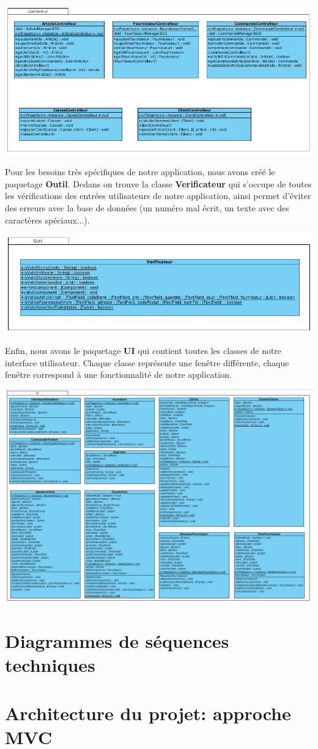 \begin{center}
\includegraphics[width=14cm]{./Conception/controlleur}
\end{center}

Pour les besoins très spécifiques de notre application, nous avons créé le paquetage \textbf{Outil}. Dedans on trouve la classe \textbf{Verificateur} qui s'occupe de toutes les vérifications des entrées utilisateurs de notre application, ainsi permet d'éviter des erreurs avec la base de données (un numéro mal écrit, un texte avec des caractères spéciaux...).

\begin{center}
\includegraphics[width=14cm]{./Conception/outil}
\end{center}

Enfin, nous avons le paquetage \textbf{UI} qui contient toutes les classes de notre interface utilisateur. Chaque classe représente une fenêtre différente, chaque fenêtre correspond à une fonctionnalité de notre application.

\begin{center}
\includegraphics[width=14cm]{./Conception/ui}
\end{center}


\section{Diagrammes de séquences techniques}

\section{Architecture du projet: approche MVC}
